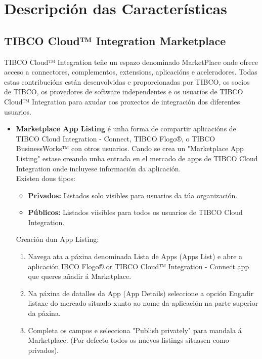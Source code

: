 \chapter{Descripción das Características}
\label{chap:DescripciónDasCaracteristicas}
\section{TIBCO Cloud™ Integration Marketplace}
\begin{flushleft}
TIBCO Cloud™ Integration teñe un espazo denominado MarketPlace onde ofrece acceso a connectores, complementos, extensions, aplicacións e aceleradores. Todas estas contribucións están desenvolvidas e proporcionadas por TIBCO, os socios de TIBCO, os provedores de software independentes e os usuarios de TIBCO Cloud™ Integration para axudar cos proxectos de integración dos diferentes usuarios. \\
\begin{itemize}
    \item \textbf{Marketplace App Listing} é unha forma de compartir aplicacións de TIBCO Cloud Integration - Connect, TIBCO Flogo®, o TIBCO BusinessWorks™ con otros usuarios. Cando se crea un "Marketplace App Listing" estase creando unha entrada en el mercado de apps de TIBCO Cloud Integration onde incluyese información da aplicación. \\ Existen dous tipos: \\ \begin{itemize}
        \item \textbf{Privados:} Listados solo visibles para usuarios da túa organización.
        \item \textbf{Públicos:} Listados viisibles para todos os usuarios de TIBCO Cloud Integration.
    \end{itemize} 
    Creación dun App Listing: \\
    \begin{enumerate}
        \item Navega ata a páxina denominada Lista de Apps (Apps List) e abre a aplicación IBCO Flogo® or TIBCO Cloud™ Integration - Connect app que queres añadir á Marketplace.
        \item Na páxina de datalles da App (App Details) seleccione a opción Engadir listaxe do mercado situado xunto ao nome da aplicación na parte superior da páxina.
        \item Completa os campos e selecciona "Publish privately" para mandala á Marketplace. (Por defecto todos os nuevos listings situasen como privados).

\end{enumerate}
\end{itemize}
\end{flushleft}
